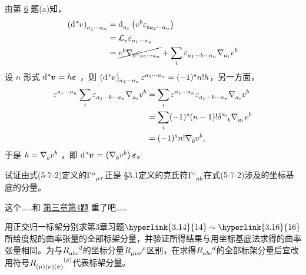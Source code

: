 \begin{xiti}
    \begin{zm}
    	由第 \hyperlink{5.6.a}{6} 题(a)知，
    	\begin{align*}
    	\tensor{\left(\dd{\tensor[^*]{v}{}}\right)}{_{a_1 \cdots a_n}} &= \dd\indices{_{a_1}} \left( \tensor{v}{^b} \tensor{\varepsilon}{_{b a_2 \cdots a_n}} \right)\\
    	&= \Ld{v} \tensor{\varepsilon}{_{a_1 \cdots a_n}}\\
    	&= \cancel{\tensor{v}{^b} \Nabla{b} \tensor{\varepsilon}{_{a_1 \cdots a_n}}} + \sum_{i} \tensor{\varepsilon}{_{a_1 \cdots b \cdots a_n}} \Nabla{a_i} \tensor{v}{^b}
    	\end{align*}
    	设 $n$ 形式 $\dd{\tensor[^*]{\bm{v}}{}}=h\bm{\varepsilon}$ ，则 $\tensor{\left(\dd{\tensor[^*]{v}{}}\right)}{_{a_1 \cdots a_n}} \tensor{\varepsilon}{^{a_1 \cdots a_n}} = (-1)^s n! h$，另一方面，
    	\begin{align*}
    	\tensor{\varepsilon}{^{a_1 \cdots a_n}} \sum_{i} \tensor{\varepsilon}{_{a_1 \cdots b \cdots a_n}} \Nabla{a_i} \tensor{v}{^b} &= \sum_{i} \tensor{\varepsilon}{^{a_1 \cdots a_n}} \tensor{\varepsilon}{_{a_1 \cdots b \cdots a_n}} \Nabla{a_i} \tensor{v}{^b}\\
    	&= \sum_{i} (-1)^s (n-1)! \tensor{\delta}{^{a_i}_b} \Nabla{a_i} \tensor{v}{^b}\\
    	&= (-1)^s n! \Nabla{b} \tensor{v}{^b},
    	\end{align*}
    	于是 $h=\Nabla{b} \tensor{v}{^b}$ ，即 $\dd{\tensor[^*]{\bm{v}}{}} = \left(\Nabla{b} \tensor{v}{^b}\right) \bm{\varepsilon}$。
    \end{zm}
    
    \item 试证由式(5-7-2)定义的$\ChristoffelSymbol{\sigma}{\mu}{\tau} $正是 \S 3.1定义的克氏符$\ChristoffelSymbol{c}{a}{b} $在式(5-7-2)涉及的坐标基底的分量。
    
    \begin{zm}
    	这个……和 \hyperlink{3.4}{第三章第4题} 重了吧……
    \end{zm}
    
    \item 用正交归一标架分别求第3章习题$\hyperlink{3.14}{14} \sim \hyperlink{3.16}{16}$所给度规的曲率张量的全部标架分量，并验证所得结果与用坐标基底法求得的曲率张量相同。为与$\tensor{R}{_a_b_c^d} $的坐标分量$\tensor{R}{_\mu_\nu_\sigma^\rho} $区别，在求得$\tensor{R}{_a_b_c^d}$的全部标架分量后宜改用符号$\tensor{R}{_{(\mu)}_{(\nu)}_{(\sigma)}^{(\rho)}} $代表标架分量。
	

\end{xiti}
